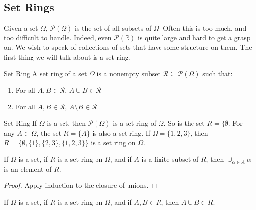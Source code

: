 \documentclass[crop=false,class=book,oneside]{standalone}
\begin{document}
        \subsection{Set Rings}
            Given a set $\Omega$, $\mathcal{P}(\Omega)$ is the
            set of all subsets of $\Omega$. Often this is too
            much, and too difficult to handle. Indeed, even
            $\mathcal{P}(\mathbb{R})$ is quite large and hard
            to get a grasp on. We wish to speak of collections
            of sets that have some structure on them.
            The first thing we will talk about is a set ring.
            \begin{ldefinition}{Set Ring}
                A set ring of a set $\Omega$ is a nonempty subset
                $\mathcal{R}\subseteq\mathcal{P}(\Omega)$ such that:
                \begin{enumerate}
                    \item For all $A,B\in\mathcal{R}$,
                          $A\cup{B}\in\mathcal{R}$
                    \item For all $A,B\in\mathcal{R}$,
                          $A\setminus{B}\in\mathcal{R}$
                \end{enumerate}
            \end{ldefinition}
            \begin{example}{Set Ring}
                If $\Omega$ is a set, then
                $\mathcal{P}(\Omega)$ is a set ring of
                $\Omega$. So is the set $R=\{\emptyset$.
                For any $A\subset\Omega$, the set
                $R=\{A\}$ is also a set ring. If
                $\Omega=\{1,2,3\}$, then
                $R=\{\emptyset,\{1\},\{2,3\},\{1,2,3\}\}$ is
                a set ring on $\Omega$.
            \end{example}
            \begin{theorem}
                If $\Omega$ is a set, if $R$ is a set ring
                on $\Omega$, and if $A$ is a finite subset of
                $R$, then $\cup_{\alpha\in{A}}\alpha$ is an
                element of $R$.
            \end{theorem}
            \begin{proof}
                Apply induction to the closure of unions.
            \end{proof}
            \begin{theorem}
                If $\Omega$ is a set, if $R$ is a set ring on
                $\Omega$, and if $A,B\in{R}$, then
                $A\cup{B}\in{R}$.
            \end{theorem}
\end{document}
